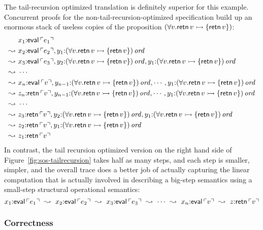 The tail-recursion optimized translation is definitely superior for
this example. Concurrent proofs for the non-tail-recursion-optimized
specification build up an enormous stack of useless copies of the
proposition $(\forall v. {\sf retn}\,v \rightarrowtail \{ {\sf retn}\,v \})$:
\begin{align*}
& x_1{:}{\sf eval}\,{\ulcorner{e_1}\urcorner} \\
\leadsto ~ & x_2{:}{\sf eval}\,{\ulcorner{e_2}\urcorner}, 
  y_1{:}{(\forall v. {\sf retn}\,v \rightarrowtail \{ {\sf retn}\,v \})}\,{{\it ord}} \\
\leadsto ~ & x_3{:}{\sf eval}\,{\ulcorner{e_3}\urcorner}, 
  y_2{:}{(\forall v. {\sf retn}\,v \rightarrowtail \{ {\sf retn}\,v \})}\,{{\it ord}}, 
  y_1{:}{(\forall v. {\sf retn}\,v \rightarrowtail \{ {\sf retn}\,v \})}\,{{\it ord}} \\
\leadsto ~ & \cdots\\
\leadsto ~ & x_n{:}{\sf eval}\,{\ulcorner{v}\urcorner}, 
  y_{n-1}{:}{(\forall v. {\sf retn}\,v \rightarrowtail \{ {\sf retn}\,v \})}\,{{\it ord}}, 
  \cdots,
  y_1{:}{(\forall v. {\sf retn}\,v \rightarrowtail \{ {\sf retn}\,v \})}\,{{\it ord}} \\
\leadsto ~ & z_n{:}{\sf retn}\,{\ulcorner{v}\urcorner}, 
  y_{n-1}{:}{(\forall v. {\sf retn}\,v \rightarrowtail \{ {\sf retn}\,v \})}\,{{\it ord}}, 
  \cdots,
  y_1{:}{(\forall v. {\sf retn}\,v \rightarrowtail \{ {\sf retn}\,v \})}\,{{\it ord}} \\
\leadsto ~ & \cdots \\
\leadsto ~ & z_3{:}{\sf retn}\,{\ulcorner{v}\urcorner}, 
  y_2{:}{(\forall v. {\sf retn}\,v \rightarrowtail \{ {\sf retn}\,v \})}\,{{\it ord}}, 
  y_1{:}{(\forall v. {\sf retn}\,v \rightarrowtail \{ {\sf retn}\,v \})}\,{{\it ord}} \\
\leadsto ~ & z_2{:}{\sf retn}\,{\ulcorner{v}\urcorner}, 
  y_1{:}{(\forall v. {\sf retn}\,v \rightarrowtail \{ {\sf retn}\,v \})}\,{{\it ord}} \\
\leadsto ~ & z_1{:}{\sf retn}\,{\ulcorner{v}\urcorner}
\end{align*}
In contrast, the tail recursion optimized version on the right hand
side of Figure~\ref{fig:sos-tailrecursion} takes half as many steps,
and each step is smaller, simpler, and the overall trace does a better
job of actually capturing the linear computation that is actually
involved in describing a big-step semantics using a small-step
structural operational semantics:
\[
x_1{:}{\sf eval}\,{\ulcorner{e_1}\urcorner} 
 ~\leadsto~
x_2{:}{\sf eval}\,{\ulcorner{e_2}\urcorner}
 ~\leadsto~
x_3{:}{\sf eval}\,{\ulcorner{e_3}\urcorner}
 ~\leadsto~ \cdots ~\leadsto~
x_n{:}{\sf eval}\,{\ulcorner{v}\urcorner}
 ~\leadsto~ 
z{:}{\sf retn}\,{\ulcorner{v}\urcorner}
\]

\subsubsection{Correctness}

